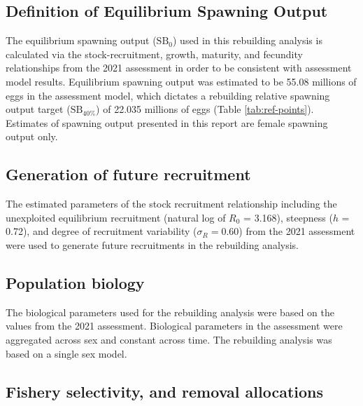 \documentclass[11pt,
  letterpaper,
]{article}
\begin{document}
\hypertarget{definition-of-equilibrium-spawning-output}{%
\subsection{Definition of Equilibrium Spawning Output}\label{definition-of-equilibrium-spawning-output}}

The equilibrium spawning output (\(\text{SB}_0\)) used in this rebuilding analysis is calculated via the stock-recruitment, growth, maturity, and fecundity relationships from the 2021 assessment in order to be consistent with assessment model results. Equilibrium spawning output was estimated to be 55.08 millions of eggs in the assessment model, which dictates a rebuilding relative spawning output target (\(\text{SB}_{40\%}\)) of 22.035 millions of eggs (Table \ref{tab:ref-points}). Estimates of spawning output presented in this report are female spawning output only.

\hypertarget{generation-of-future-recruitment}{%
\subsection{Generation of future recruitment}\label{generation-of-future-recruitment}}

The estimated parameters of the stock recruitment relationship including the unexploited equilibrium recruitment (natural log of \(R_0\) = 3.168), steepness (\(h\) = 0.72), and degree of recruitment variability (\(\sigma_R = 0.60\)) from the 2021 assessment were used to generate future recruitments in the rebuilding analysis.

\hypertarget{population-biology}{%
\subsection{Population biology}\label{population-biology}}

The biological parameters used for the rebuilding analysis were based on the values from the 2021 assessment. Biological parameters in the assessment were aggregated across sex and constant across time. The rebuilding analysis was based on a single sex model.

\hypertarget{fishery-selectivity-and-removal-allocations}{%
\subsection{Fishery selectivity, and removal allocations}\label{fishery-selectivity-and-removal-allocations}}
\end{document}
